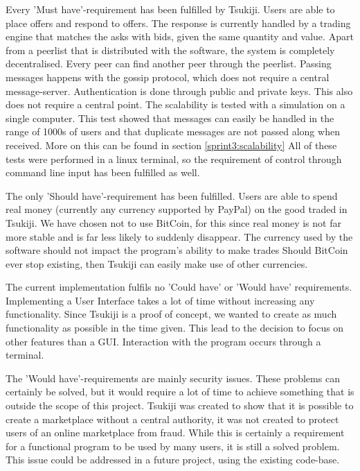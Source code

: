 Every 'Must have'-requirement has been fulfilled by Tsukiji.
Users are able to place offers and respond to offers. 
The response is currently handled by a trading engine that matches the asks with bids, given the same quantity and value.
Apart from a peerlist that is distributed with the software, the system is completely decentralised. 
Every peer can find another peer through the peerlist.
Passing messages happens with the gossip protocol, which does not require a central message-server.
Authentication is done through public and private keys.
This also does not require a central point.
The scalability is tested with a simulation on a single computer.
This test showed that messages can easily be handled in the range of 1000s of users and that duplicate messages are not passed along when received.
More on this can be found in section \ref{sprint3:scalability}
All of these tests were performed in a linux terminal, so the requirement of control through command line input has been fulfilled as well.

The only 'Should have'-requirement has been fulfilled.
Users are able to spend real money (currently any currency supported by PayPal) on the good traded in Tsukiji.
We have chosen not to use BitCoin, for this since real money is not far more stable and is far less likely to suddenly disappear. 
The currency used by the software should not impact the program's ability to make trades
Should BitCoin ever stop existing, then Tsukiji can easily make use of other currencies.

The current implementation fulfils no 'Could have' or 'Would have' requirements.
Implementing a User Interface takes a lot of time without increasing any functionality.
Since Tsukiji is a proof of concept, we wanted to create as much functionality as possible in the time given.
This lead to the decision to focus on other features than a GUI.
Interaction with the program occurs through a terminal.

The 'Would have'-requirements are mainly security issues.
These problems can certainly be solved, but it would require a lot of time to achieve something that is outside the scope of this project.
Tsukiji was created to show that it is possible to create a marketplace without a central authority, it was not created to protect users of an online marketplace from fraud.
While this is certainly a requirement for a functional program to be used by many users, it is still a solved problem.
This issue could be addressed in a future project, using the existing code-base.

